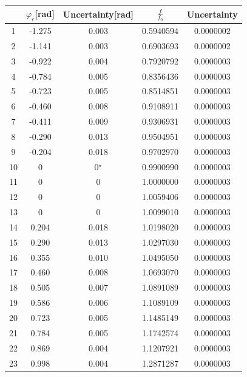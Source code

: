 \documentclass{my_template}
\renewcommand{\phi}{\varphi}
\begin{document}
    \begin{table}[H]
        \begin{center}
            \begin{tabular}{|c|c|c|c|c|}
                \hline
                &$\phi_e$[rad]&Uncertainty[rad]&$\frac{f}{f_0}$&Uncertainty\\\hline
                1&-1.275&0.003&0.5940594&0.0000002\\\hline
                2&-1.141&0.003&0.6903693&0.0000002\\\hline
                3&-0.922&0.004&0.7920792&0.0000003\\\hline
                4&-0.784&0.005&0.8356436&0.0000003\\\hline
                5&-0.723&0.005&0.8514851&0.0000003\\\hline
                6&-0.460&0.008&0.9108911&0.0000003\\\hline
                7&-0.411&0.009&0.9306931&0.0000003\\\hline
                8&-0.290&0.013&0.9504951&0.0000003\\\hline
                9&-0.204&0.018&0.9702970&0.0000003\\\hline
                10&0&0$^\star$&0.9900990&0.0000003\\\hline
                11&0&0&1.0000000&0.0000003\\\hline
                12&0&0&1.0059406&0.0000003\\\hline
                13&0&0&1.0099010&0.0000003\\\hline
                14&0.204&0.018&1.0198020&0.0000003\\\hline
                15&0.290&0.013&1.0297030&0.0000003\\\hline
                16&0.355&0.010&1.0495050&0.0000003\\\hline
                17&0.460&0.008&1.0693070&0.0000003\\\hline
                18&0.505&0.007&1.0891089&0.0000003\\\hline
                19&0.586&0.006&1.1089109&0.0000003\\\hline
                20&0.723&0.005&1.1485149&0.0000003\\\hline
                21&0.784&0.005&1.1742574&0.0000003\\\hline
                22&0.869&0.004&1.1207921&0.0000003\\\hline
                23&0.998&0.004&1.2871287&0.0000003\\\hline

\end{tabular}
\end{center}
\end{table}
\end{document}
